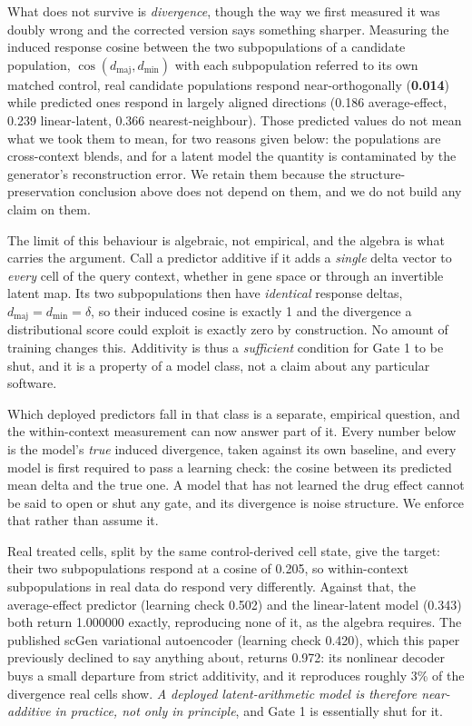 \documentclass[11pt,letterpaper]{article}
\begin{document}
What does not survive is \emph{divergence}, though the way we first measured it was doubly wrong
and the corrected version says something sharper. Measuring the induced response cosine between the
two subpopulations of a candidate population, $\cos(d_{\mathrm{maj}}, d_{\mathrm{min}})$ with each
subpopulation referred to its own matched control, real candidate populations respond
near-orthogonally (\textbf{0.014}) while predicted ones respond in largely aligned directions
(0.186 average-effect, 0.239 linear-latent, 0.366 nearest-neighbour). Those predicted
values do not mean what we took them to mean, for two reasons given below: the populations are
cross-context blends, and for a latent model the quantity is contaminated by the generator's
reconstruction error. We retain them because the structure-preservation conclusion above does not
depend on them, and we do not build any claim on them.

The limit of this behaviour is algebraic, not empirical, and the algebra is what carries the
argument. Call a predictor additive if it adds a \emph{single} delta vector to
\emph{every} cell of the query context, whether in gene space or through an invertible latent
map. Its two subpopulations then have \emph{identical} response deltas, $d_{\mathrm{maj}} =
d_{\mathrm{min}} = \delta$, so their induced cosine is exactly 1 and the divergence a
distributional score could exploit is exactly zero by construction. No amount of
training changes this. Additivity is thus a \emph{sufficient} condition for Gate 1 to be shut,
and it is a property of a model class, not a claim about any particular software.

Which deployed predictors fall in that class is a separate, empirical question, and the
within-context measurement can now answer part of it. Every number below is the model's \emph{true}
induced divergence, taken against its own baseline, and every model is first required to pass a
learning check: the cosine between its predicted mean delta and the true one. A model that
has not learned the drug effect cannot be said to open or shut any gate, and its divergence is noise
structure. We enforce that rather than assume it.

Real treated cells, split by the same control-derived cell state, give the target: their two
subpopulations respond at a cosine of 0.205, so within-context subpopulations in real data
do respond very differently. Against that, the average-effect predictor (learning check 0.502) and
the linear-latent model (0.343) both return 1.000000 exactly, reproducing none of it, as the
algebra requires. The published scGen variational autoencoder (learning check 0.420), which
this paper previously declined to say anything about, returns 0.972: its nonlinear decoder
buys a small departure from strict additivity, and it reproduces roughly 3\% of the divergence real
cells show. \emph{A deployed latent-arithmetic model is therefore near-additive in practice, not only
in principle}, and Gate 1 is essentially shut for it.
\end{document}
